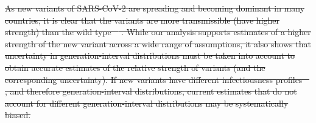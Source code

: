 \documentclass[12pt]{article}
\providecommand{\DIFdeltex}[1]{{\protect\color{red}\sout{#1}}}                      %
\providecommand{\DIFdelbegin}{} %
\providecommand{\DIFdel}[1]{\texorpdfstring{\DIFdeltex{#1}}{}} %
\newcommand{\DIFscaledelfig}{0.5}
\newlength{\DIFdelgraphicswidth} %
\newlength{\DIFdelgraphicsheight} %
\newcommand{\DIFdelincludegraphics}[2][]{%
\sbox{\DIFdelgraphicsbox}{\DIFOincludegraphics[#1]{#2}}%
\settoboxwidth{\DIFdelgraphicswidth}{\DIFdelgraphicsbox} %
\settoboxtotalheight{\DIFdelgraphicsheight}{\DIFdelgraphicsbox} %
\scalebox{\DIFscaledelfig}{%
\parbox[b]{\DIFdelgraphicswidth}{\usebox{\DIFdelgraphicsbox}\\[-\baselineskip] \rule{\DIFdelgraphicswidth}{0em}}\llap{\resizebox{\DIFdelgraphicswidth}{\DIFdelgraphicsheight}{%
\setlength{\unitlength}{\DIFdelgraphicswidth}%
\begin{picture}(1,1)%
\thicklines\linethickness{2pt} %
{\color[rgb]{1,0,0}\put(0,0){\framebox(1,1){}}}%
{\color[rgb]{1,0,0}\put(0,0){\line( 1,1){1}}}%
{\color[rgb]{1,0,0}\put(0,1){\line(1,-1){1}}}%
\end{picture}%
}\hspace*{3pt}}} %
} %
\DeclareRobustCommand{\DIFdelbegin}{\DIFOdelbegin \let\includegraphics\DIFdelincludegraphics} %
\begin{document}
\DIFdelbegin \DIFdel{As new variants of SARS-CoV-2 are spreading and becoming dominant in many countries, it is clear that the variants are more transmissible (have higher strength) than the wild type \mbox{%
\citep{switzerland2021variant, davies2021estimated, di2021impact, graham2021changes, leung2021early, volz2021transmission,zhao2021}}\hspace{0pt}%
.
While our analysis supports estimates of a higher strength of the new variant across a wide range of assumptions, it also shows that uncertainty in generation-interval distributions must be taken into account to obtain accurate estimates of the relative strength of variants (and the corresponding uncertainty).
If new variants have different infectiousness profiles \mbox{%
\citep{kissler2021densely,li2021viral,zhang2021transmission}}\hspace{0pt}%
, and therefore generation-interval distributions, current estimates that do not account for different generation-interval distributions may be systematically biased.
}%
\end{document}
